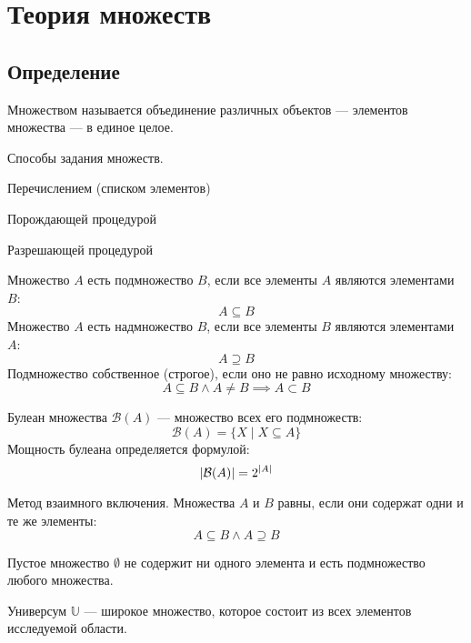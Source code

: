 \section{Теория множеств}

\subsection{Определение}

{\bold Множеством} называется объединение {\ital различных} объектов --- {\ital элементов} множества --- в единое целое.

\begin{theorem}
{\bold Способы задания множеств.}
\begin{list*}[][\#]
\item Перечислением {\ital (списком элементов)}
\item Порождающей процедурой
\item Разрешающей процедурой
\end{list*}
\end{theorem}

Множество $A$ есть {\bold подмножество} $B$, если все элементы $A$ являются элементами $B$:
$$A\subseteq B$$  
Множество $A$ есть {\bold надмножество} $B$, если все элементы $B$ являются элементами $A$:
$$A\supseteq B$$
Подмножество {\bold собственное} {\ital (строгое)}, если оно {\ital не равно} исходному множеству:
$$A\subseteq B\land A\neq B\implies A\subset B$$
\begin{theorem}
{\bold Булеан} множества ${\mathcal B}(A)$ --- множество всех его подмножеств:
$${\mathcal B}(A)=\{X\mid X\subseteq A\}$$
{\ital Мощность} булеана определяется формулой:
$$\left|{\mathcal B}(A)\right|=2^{\left|A\right|}$$
\end{theorem}
\begin{theorem}
{\bold Метод взаимного включения.} Множества $A$ и $B$ {\ital равны}, если они содержат одни и те же элементы:
$$A\subseteq B\land A\supseteq B$$
\end{theorem}

\begin{theorem}
{\bold Пустое множество} $\emptyset$ не содержит {\ital ни одного элемента} и есть подмножество любого множества.

{\bold Универсум} $\mathbb{U}$ --- широкое множество, которое состоит из всех элементов {\ital исследуемой области}.
\end{theorem}


